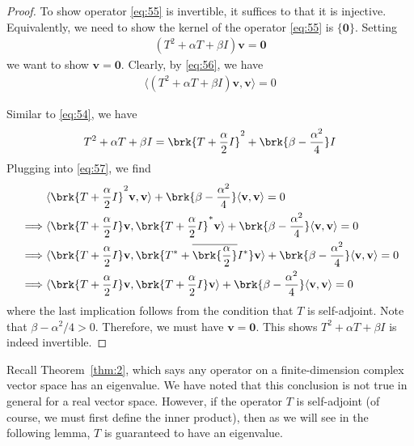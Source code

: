 \documentclass[thmcnt=section, color=blue, 12pt]{my-elegantbook}
\begin{document}
\begin{proof}
	To show operator \eqref{eq:55} is invertible,
	it suffices to that it is injective.
	Equivalently, we need to show the kernel of 
	the operator \eqref{eq:55} is $\{\mathbf{0}\}$.
	Setting
	\begin{align}
		(T^2 + \alpha T + \beta I) \mathbf{v} = \mathbf{0}
		\label{eq:56}
	\end{align}
	we want to show $\mathbf{v} = \mathbf{0}$.
	Clearly, by \eqref{eq:56}, we have 
	\begin{align}
		\langle (T^2 + \alpha T + \beta I) \mathbf{v}, \mathbf{v} \rangle = 0
		\label{eq:57}
	\end{align}

	Similar to \eqref{eq:54}, we have 
	\begin{align*}
		T^2 + \alpha T + \beta I 
		= \brk{T + \frac{\alpha}{2} I}^2 + \brk{\beta - \frac{\alpha^2}{4}} I
	\end{align*}
	Plugging into \eqref{eq:57}, we find 
	\begin{align*}
		&\langle \brk{T + \frac{\alpha}{2} I}^2 \mathbf{v}, \mathbf{v} \rangle 
		+ \brk{\beta - \frac{\alpha^2}{4}} \langle \mathbf{v}, \mathbf{v} \rangle 
		= 0 \\
		\implies & \langle \brk{T + \frac{\alpha}{2} I} \mathbf{v}, \brk{T + \frac{\alpha}{2} I}^\ast \mathbf{v} \rangle 
		+ \brk{\beta - \frac{\alpha^2}{4}} \langle \mathbf{v}, \mathbf{v} \rangle 
		= 0 \\ 
		\implies & \langle \brk{T + \frac{\alpha}{2} I} \mathbf{v}, 
		\brk{T^\ast + \overline{\brk{\frac{\alpha}{2}}} I^\ast} \mathbf{v} \rangle 
		+ \brk{\beta - \frac{\alpha^2}{4}} \langle \mathbf{v}, \mathbf{v} \rangle 
		= 0 \\
	\implies & \langle \brk{T + \frac{\alpha}{2} I} \mathbf{v}, \brk{T + \frac{\alpha}{2} I} \mathbf{v} \rangle 
		+ \brk{\beta - \frac{\alpha^2}{4}} \langle \mathbf{v}, \mathbf{v} \rangle 
		= 0
	\end{align*}
	where the last implication follows from the condition 
	that $T$ is self-adjoint.
	Note that $\beta - \alpha^2 / 4 > 0$.
	Therefore, we must have $\mathbf{v} = \mathbf{0}$.
	This shows $T^2 + \alpha T + \beta I$ is indeed invertible.
\end{proof}


Recall Theorem~\ref{thm:2}, which says
any operator on a finite-dimension complex vector space
has an eigenvalue.
We have noted that this conclusion is not true in general
for a real vector space.
However, if the operator $T$ is self-adjoint 
(of course, we must first define the inner product),
then as we will see in the 
following lemma, $T$ is guaranteed to have an eigenvalue.
\end{document}
